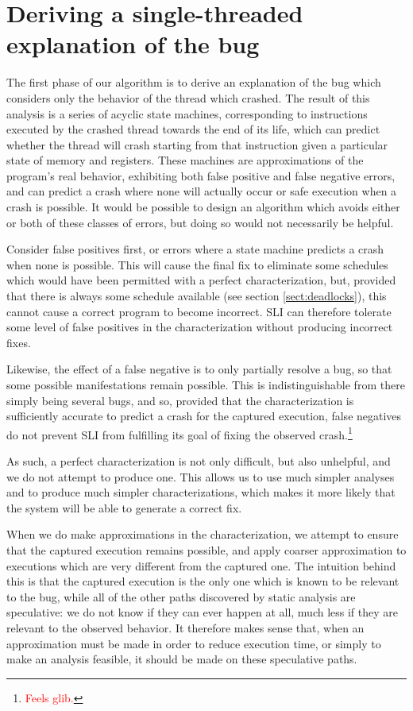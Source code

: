 \documentclass[10pt,twocolumn,preprint,natbib,authoryear]{sigplanconf}
\newcommand{\editorial}[1]{\textcolor{red}{\footnote{\textcolor{red}{#1}}}}
\begin{document}
\section{Deriving a single-threaded explanation of the bug}
\label{sect:build_state_machines}

The first phase of our algorithm is to derive an explanation of the
bug which considers only the behavior of the thread which crashed.
The result of this analysis is a series of acyclic state machines,
corresponding to instructions executed by the crashed thread towards
the end of its life, which can predict whether the thread will crash
starting from that instruction given a particular state of memory and
registers.  These machines are approximations of the program's real
behavior, exhibiting both false positive and false negative errors,
and can predict a crash where none will actually occur or safe
execution when a crash is possible.  It would be possible to design an
algorithm which avoids either or both of these classes of errors, but
doing so would not necessarily be helpful.

Consider false positives first, or errors where a state machine
predicts a crash when none is possible.  This will cause the final fix
to eliminate some schedules which would have been permitted with a
perfect characterization, but, provided that there is always some
schedule available (see section \ref{sect:deadlocks}), this cannot
cause a correct program to become incorrect.  SLI can therefore
tolerate some level of false positives in the characterization without
producing incorrect fixes.

Likewise, the effect of a false negative is to only partially resolve
a bug, so that some possible manifestations remain possible.  This is
indistinguishable from there simply being several bugs, and so,
provided that the characterization is sufficiently accurate to predict
a crash for the captured execution, false negatives do not prevent SLI
from fulfilling its goal of fixing the observed crash.\editorial{Feels
  glib.}

As such, a perfect characterization is not only difficult, but also
unhelpful, and we do not attempt to produce one.  This allows us to
use much simpler analyses and to produce much simpler
characterizations, which makes it more likely that the system will be
able to generate a correct fix.

When we do make approximations in the characterization, we attempt to
ensure that the captured execution remains possible, and apply coarser
approximation to executions which are very different from the captured
one.  The intuition behind this is that the captured execution is the
only one which is known to be relevant to the bug, while all of the
other paths discovered by static analysis are speculative: we do not
know if they can ever happen at all, much less if they are relevant to
the observed behavior.  It therefore makes sense that, when an
approximation must be made in order to reduce execution time, or
simply to make an analysis feasible, it should be made on these
speculative paths.
\end{document}
